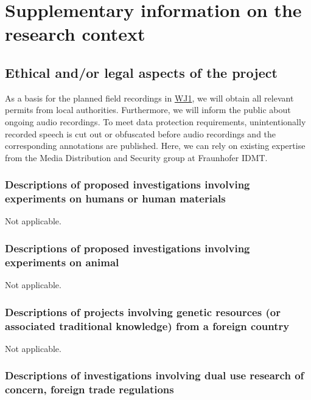 \documentclass[11pt]{article}
\newcommand{\wpref}[2]{\hyperlink{sec:W#1}{#2}}
\begin{document}
\section{Supplementary information on the research context}

\subsection{Ethical and/or legal aspects of the project}

As a basis for the planned field recordings in \wpref{J1}{WJ1}, we will obtain all relevant permits from local authorities. Furthermore, we will inform the public about ongoing audio recordings.
To meet data protection requirements, unintentionally recorded speech is cut out or obfuscated before audio recordings and the corresponding annotations are published.
Here, we can rely on existing expertise from the Media Distribution and Security group at Fraunhofer IDMT.

\subsubsection{Descriptions of proposed investigations involving experiments on humans or human materials}

Not applicable.
\vspace{-.3cm}

\subsubsection{Descriptions of proposed investigations involving experiments on animal}

Not applicable.
\vspace{-.3cm}

\subsubsection{Descriptions of projects involving genetic resources (or associated traditional knowledge) from a foreign country}

Not applicable.
\vspace{-.3cm}

\subsubsection{Descriptions of investigations involving dual use research of concern, foreign trade regulations}
\end{document}
